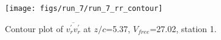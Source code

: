 \begin{figure}[H]
\centering
\texttt{[image: figs/run\_7/run\_7\_rr\_contour]}
\caption{Contour plot of $\overline{v_{r}^{\prime} v_{r}^{\prime}}$ at $z/c$=5.37, $V_{free}$=27.02, station 1.}
\label{fig:run_7_rr_contour}
\end{figure}


